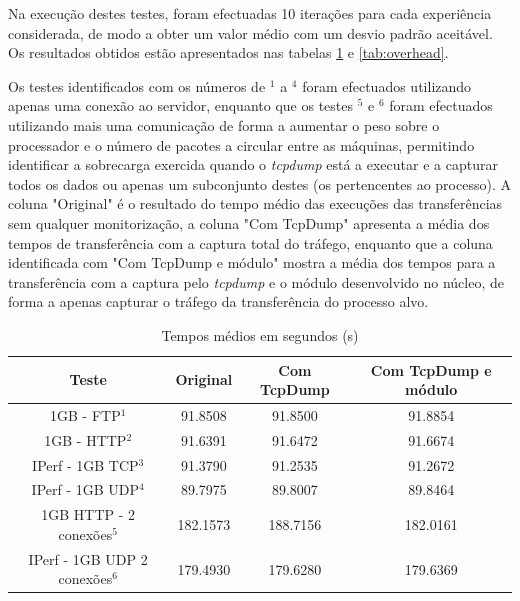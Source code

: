 \documentclass[a4paper]{llncs}
\begin{document}
Na execução destes testes, foram efectuadas 10 iterações para cada experiência considerada, de modo a obter um valor médio com um desvio padrão aceitável. Os resultados obtidos estão apresentados nas tabelas \ref{tab:desempenho} e \ref{tab:overhead}.

Os testes identificados com os números de $^{1}$ a $^{4}$ foram efectuados utilizando apenas uma conexão ao servidor, enquanto que os testes $^{5}$ e $^{6}$ foram efectuados utilizando mais uma comunicação de forma a aumentar o peso sobre o processador e o número de pacotes a circular entre as máquinas, permitindo identificar a sobrecarga exercida quando o \textit{tcpdump} está a executar e a capturar todos os dados ou apenas um subconjunto destes (os pertencentes ao processo).
 A coluna "Original" é o resultado do tempo médio das execuções das transferências sem qualquer monitorização, a coluna "Com TcpDump" apresenta a média dos tempos de transferência com a captura total do tráfego, enquanto que a coluna identificada com "Com TcpDump e módulo" mostra a média dos tempos para a transferência com a captura pelo \textit{tcpdump} e o módulo desenvolvido no núcleo, de forma a apenas capturar o tráfego da transferência do processo alvo.

\begin{table}
\begin{center}

\begin{tabular}{ | c | c | c | c |  }
\hline
Teste & \hspace {0.3cm} Original \hspace {0.3cm}& \hspace {0.2cm} Com TcpDump \hspace {0.2cm} & Com TcpDump e módulo \\
\hline
1GB - FTP$^{1}$ & 91.8508	& 91.8500 & 91.8854 \\
1GB - HTTP$^{2}$ & 91.6391 & 91.6472 & 91.6674 \\ 
IPerf - 1GB TCP$^{3}$ & 91.3790	& 91.2535	& 91.2672 \\
IPerf - 1GB UDP$^{4}$ & 89.7975 & 89.8007 & 89.8464 \\
\hline
\hline
1GB HTTP - 2 conexões$^{5}$ & 182.1573 & 188.7156 & 182.0161 \\
IPerf - 1GB UDP 2 conexões$^{6}$ & 179.4930 & 179.6280 & 179.6369 \\
\hline
\end{tabular}
\caption{Tempos médios em segundos (s)}
\label{tab:desempenho}
\end{center}
\end{table}
\end{document}
